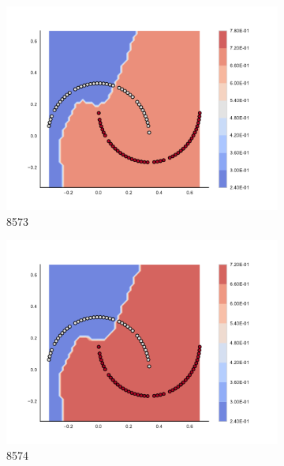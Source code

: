 \begin{figure}[h]
\begin{subfigure}[b]{0.09\textwidth}
    \includegraphics[clip, trim=2.35cm 1.75cm 4.5cm 0cm,width=\textwidth]{img/convergence/8573.pdf}
    \caption{8573}
    \label{fig:convergence_8573}
\end{subfigure}
%
\begin{subfigure}[b]{0.09\textwidth}
    \includegraphics[clip, trim=2.35cm 1.75cm 4.5cm 0cm,width=\textwidth]{img/convergence/8574.pdf}
    \caption{8574}
    \label{fig:convergence_8574}
\end{subfigure}
%
\begin{subfigure}[b]{0.09\textwidth}

\end{subfigure}
\end{figure}
